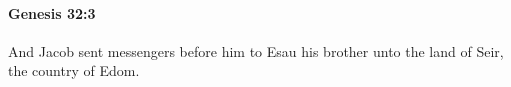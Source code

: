 
		\paragraph{Genesis 32:3} %
			\label{GENESIS-32-3}

			And Jacob sent messengers before him to Esau his brother unto the land of Seir, the country of Edom.


